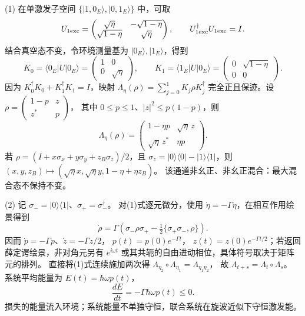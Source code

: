 (1) 在单激发子空间 \(\{|1,0_E\rangle,|0,1_E\rangle\}\) 中，可取
\[
 U_{\rm 1exc}=\begin{pmatrix}\sqrt\eta&-\sqrt{1-\eta}\\
 \sqrt{1-\eta}&\sqrt\eta\end{pmatrix},\qquad
 U_{\rm 1exc}^\dagger U_{\rm 1exc}=I .
\]
结合真空态不变，令环境测量基为 \(|0_E\rangle,|1_E\rangle\)，得到
\[
 K_0=\langle0_E|U|0_E\rangle=
 \begin{pmatrix}1&0\\0&\sqrt\eta\end{pmatrix},\qquad
 K_1=\langle1_E|U|0_E\rangle=
 \begin{pmatrix}0&\sqrt{1-\eta}\\0&0\end{pmatrix}.
\]
因为 \(K_0^\dagger K_0+K_1^\dagger K_1=I\)，映射
\(\Lambda_\eta(\rho)=\sum_{j=0}^1K_j\rho K_j^\dagger\)
完全正且保迹。设
\(\rho=\begin{pmatrix}1-p&z\\z^*&p\end{pmatrix}\)，
其中 \(0\le p\le1\)、\(|z|^2\le p(1-p)\)，则
\[
 \boxed{\Lambda_\eta(\rho)=
 \begin{pmatrix}1-\eta p&\sqrt\eta\,z\\
 \sqrt\eta\,z^*&\eta p\end{pmatrix}}.
\]
若 \(\rho=(I+x\sigma_x+y\sigma_y+z_B\sigma_z)/2\)，且
\(\sigma_z=|0\rangle\langle0|-|1\rangle\langle1|\)，则
\((x,y,z_B)\mapsto(\sqrt\eta x,\sqrt\eta y,1-\eta+\eta z_B)\)。
该通道非幺正、非幺正混合：最大混合态不保持不变。

(2) 记 \(\sigma_-=|0\rangle\langle1|\)、\(\sigma_+=\sigma_-^\dagger\)。
对(1)式逐元微分，使用 \(\dot\eta=-\Gamma\eta\)，在相互作用绘景得到
\[
 \boxed{\dot\rho=\Gamma\left(\sigma_-\rho\sigma_+
 -\tfrac12\{\sigma_+\sigma_-,\rho\}\right)}.
\]
因而 \(\dot p=-\Gamma p\)、\(\dot z=-\Gamma z/2\)，
\(p(t)=p(0)e^{-\Gamma t}\)，
\(z(t)=z(0)e^{-\Gamma t/2}\)；若返回薛定谔绘景，非对角元另有 \(e^{i\omega t}\) 或其共轭的自由进动相位，具体符号取决于矩阵元的排列。
直接将(1)式连续施加两次得
\(\Lambda_{\eta_2}\circ\Lambda_{\eta_1}=\Lambda_{\eta_1\eta_2}\)，
故 \(\Lambda_{t+s}=\Lambda_t\circ\Lambda_s\)。
系统平均能量为 \(E(t)=\hbar\omega p(t)\)，
\[
 \boxed{\frac{dE}{dt}=-\Gamma\hbar\omega p(t)\le0}.
\]
损失的能量流入环境；系统能量不单独守恒，联合系统在旋波近似下守恒激发能。

